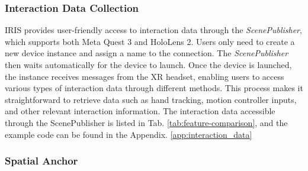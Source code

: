 \subsubsection{Interaction Data Collection}
\label{sec:interaction_data_collection}
IRIS provides user-friendly access to interaction data through the \textit{ScenePublisher}, which supports both Meta Quest 3 and HoloLens 2. 
Users only need to create a new device instance and assign a name to the connection.
The \textit{ScenePublisher} then waits automatically for the device to launch.
Once the device is launched, the instance receives messages from the XR headset, enabling users to access various types of interaction data through different methods.
This process makes it straightforward to retrieve data such as hand tracking, motion controller inputs, and other relevant interaction information.
The interaction data accessible through the ScenePublisher is listed in Tab. \ref{tab:feature-comparison},
and the example code can be found in the Appendix.
\ref{app:interaction_data}









\subsubsection{Spatial Anchor}
\label{sec:spatial_anchor}


